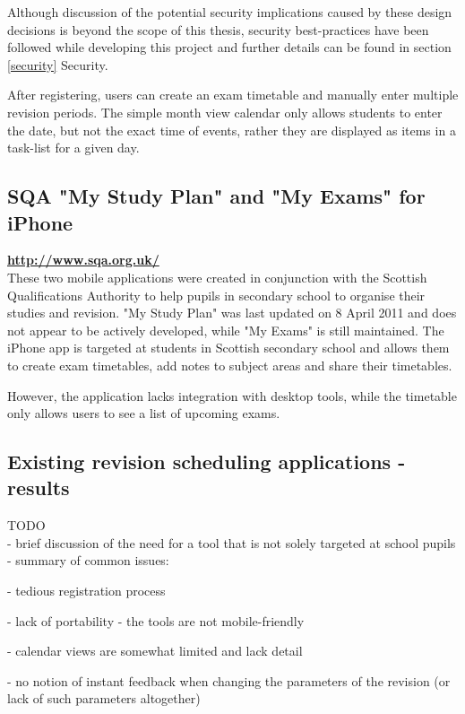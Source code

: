 \documentclass[bsc,frontabs,twoside,singlespacing,parskip]{infthesis}     %
\begin{document}
		Although discussion of the potential security implications caused by these design decisions is beyond the scope of this thesis, security best-practices have been followed while developing this project and further details can be found in section \ref{security} Security.

		After registering, users can create an exam timetable and manually enter multiple revision periods. The simple month view calendar only allows students to enter the date, but not the exact time of events, rather they are displayed as items in a task-list for a given day.

		\subsection{SQA "My Study Plan" and "My Exams" for iPhone}
		\textbf{\hyperref[http://www.sqa.org.uk/sqa/1439.html]{http://www.sqa.org.uk/}}\\
		These two mobile applications were created in conjunction with the Scottish Qualifications Authority to help pupils in secondary school to organise their studies and revision. "My Study Plan" was last updated on 8 April 2011 and does not appear to be actively developed, while "My Exams" is still maintained. The iPhone app is targeted at students in Scottish secondary school and allows them to create exam timetables, add notes to subject areas and share their timetables.

		However, the application lacks integration with desktop tools, while the timetable only allows users to see a list of upcoming exams.

		\subsection{Existing revision scheduling applications - results}
		TODO\\
		- brief discussion of the need for a tool that is not solely targeted at school pupils\\
		- summary of common issues:

		\hspace{10 mm}	- tedious registration process

		\hspace{10 mm}	- lack of portability - the tools are not mobile-friendly

		\hspace{10 mm}	- calendar views are somewhat limited and lack detail

		\hspace{10 mm}	- no notion of instant feedback when changing the parameters of the revision (or lack of such parameters altogether)
\end{document}
